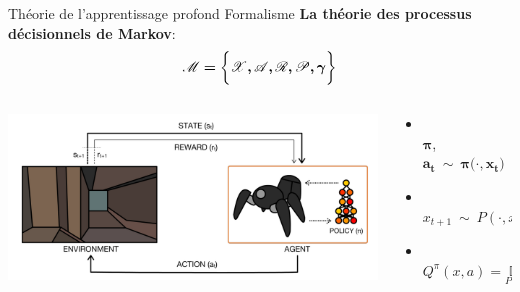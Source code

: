 \begin{frame}{Théorie de l'apprentissage profond}
Formalisme \textbf{La théorie des processus décisionnels de Markov}:
\[
    \bm{\mathcal{M} = \bigg\{\mathcal{X}, \mathcal{A}, \mathcal{R}, \mathcal{P}, \gamma\bigg\} }
\]

\begin{columns}[T] %
\begin{column}{.48\textwidth}
\begin{center}
\includegraphics[scale=.14]{./reinforcementlearning/rl}
\end{center}
\end{column}%
\hfill%
\begin{column}{.68\textwidth}
\begin{itemize}
    \item {}\\ $\bm{\pi}$,  $\bm{a_t\:\sim\: \pi\big(\cdot, x_t\big) }$
    \item {}\\ $ x_{t+1} \:\sim\: P(\cdot, x_t, a_t) $
    \item {}\\ $ Q^\pi(x, a) = \underset{P, \pi}{\mathbb{E}} \Big[ \underset{t}{\sum} \gamma^t r_t(x_t, a_t) \,\vert\, x_0,a_0=x,a \Big]$
\end{itemize}
\end{column}%
\end{columns}

\end{frame}
